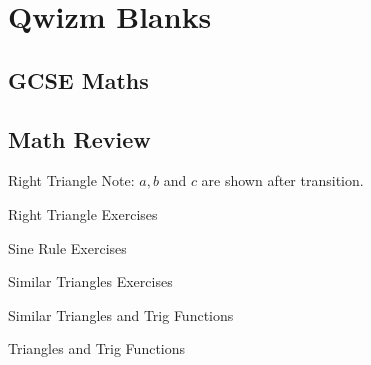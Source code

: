 \documentclass[9pt,xcolor={svgnames, x11names}]{beamer}
\begin{document}

\section{Qwizm Blanks}
\subsection{GCSE Maths}
\subsection{Math Review}


\begin{frame}{Right Triangle}
  Note: $a, b$ and $c$ are shown after transition.
  \vspace{1cm}
  
\end{frame}

\begin{frame}{Right Triangle Exercises}
    \resizebox{0.75\textwidth}{!}{%
    
  }
\end{frame}

\begin{frame}{Sine Rule Exercises}
  
\end{frame}

\begin{frame}{Similar Triangles Exercises}
  
\end{frame}

\begin{frame}{Similar Triangles and Trig Functions}
  
\end{frame}

\begin{frame}{Triangles and Trig Functions}
  
\end{frame}
\end{document}
